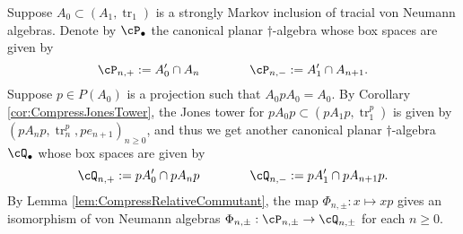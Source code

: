\documentclass[11pt]{article}
\theoremstyle{plain}
\theoremstyle{definition}
\DeclareMathOperator{\tr}{tr}
\begin{document}

Suppose $A_0\subset (A_1,\tr_1)$ is a strongly Markov inclusion of tracial von Neumann algebras.
Denote by $\cP_\bullet$ the canonical planar $\dag$-algebra whose box spaces are given by
$$
\cP_{n,+}
:=
A_0'\cap A_n
\qquad\qquad
\cP_{n,-}
:=
A_1'\cap A_{n+1}.
$$
Suppose $p\in P(A_0)$ is a projection such that $A_0pA_0 = A_0$.
By Corollary \ref{cor:CompressJonesTower}, the Jones tower for $pA_0p \subset (pA_1p, \tr^p_1)$ is given by $(pA_np, \tr^p_n, pe_{n+1})_{n\geq 0}$, and thus we get another canonical planar $\dag$-algebra $\cQ_\bullet$ whose box spaces are given by
$$
\cQ_{n,+}
:=
pA_0'\cap pA_np
\qquad\qquad
\cQ_{n,-}
:=
pA_1'\cap pA_{n+1}p.
$$
By Lemma \ref{lem:CompressRelativeCommutant}, the map $\Phi_{n,\pm}:x\mapsto xp$ gives an isomorphism of von Neumann algebras $\Phi_{n,\pm}:\cP_{n,\pm}\to \cQ_{n,\pm}$ for each $n\geq 0$.
\end{document}
